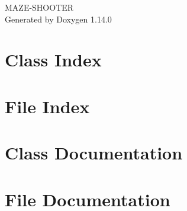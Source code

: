 \documentclass[twoside]{book}
\newcommand{\+}{\discretionary{\mbox{\scriptsize$\hookleftarrow$}}{}{}}
\newcommand{\clearemptydoublepage}{%
    \newpage{\pagestyle{empty}\cleardoublepage}%
  }
\begin{document}
  \raggedbottom
    \hypersetup{pageanchor=false,
                bookmarksnumbered=true,
                pdfencoding=unicode
               }
  \begin{titlepage}
  \vspace*{7cm}
  \begin{center}%
  {\Large MAZE-\/\+SHOOTER}\\
  \vspace*{1cm}
  {\large Generated by Doxygen 1.14.0}\\
  \end{center}
  \end{titlepage}
  \clearemptydoublepage
  \tableofcontents
  \clearemptydoublepage
  \hypersetup{pageanchor=true}
\chapter{Class Index}

\chapter{File Index}

\chapter{Class Documentation}







\chapter{File Documentation}










  \backmatter
  \newpage
  \clearemptydoublepage
  \printindex
\end{document}
